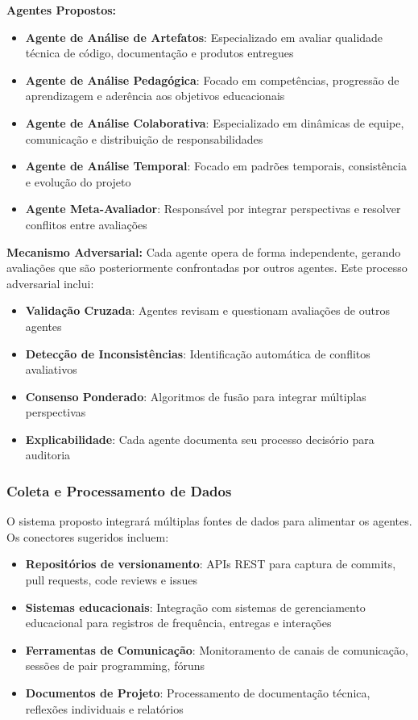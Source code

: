 \documentclass[english, spanish, brazilian]{modelo_dt}
\begin{document}
\textbf{Agentes Propostos:}

\begin{itemize}
  \item \textbf{Agente de Análise de Artefatos}: Especializado em avaliar qualidade técnica de código, documentação e produtos entregues
  \item \textbf{Agente de Análise Pedagógica}: Focado em competências, progressão de aprendizagem e aderência aos objetivos educacionais
  \item \textbf{Agente de Análise Colaborativa}: Especializado em dinâmicas de equipe, comunicação e distribuição de responsabilidades
  \item \textbf{Agente de Análise Temporal}: Focado em padrões temporais, consistência e evolução do projeto
  \item \textbf{Agente Meta-Avaliador}: Responsável por integrar perspectivas e resolver conflitos entre avaliações
\end{itemize}

\textbf{Mecanismo Adversarial:}
Cada agente opera de forma independente, gerando avaliações que são posteriormente confrontadas por outros agentes. Este processo adversarial inclui:

\begin{itemize}
  \item \textbf{Validação Cruzada}: Agentes revisam e questionam avaliações de outros agentes
  \item \textbf{Detecção de Inconsistências}: Identificação automática de conflitos avaliativos
  \item \textbf{Consenso Ponderado}: Algoritmos de fusão para integrar múltiplas perspectivas
  \item \textbf{Explicabilidade}: Cada agente documenta seu processo decisório para auditoria
\end{itemize}

\subsubsection{Coleta e Processamento de Dados}

O sistema proposto integrará múltiplas fontes de dados para alimentar os
agentes. Os conectores sugeridos incluem:

\begin{itemize}
  \item \textbf{Repositórios de versionamento}: APIs REST para captura de commits, pull requests, code reviews e issues
  \item \textbf{Sistemas educacionais}: Integração com sistemas de gerenciamento educacional para registros de frequência, entregas e interações
  \item \textbf{Ferramentas de Comunicação}: Monitoramento de canais de comunicação, sessões de pair programming, fóruns
  \item \textbf{Documentos de Projeto}: Processamento de documentação técnica, reflexões individuais e relatórios
\end{itemize}
\end{document}
